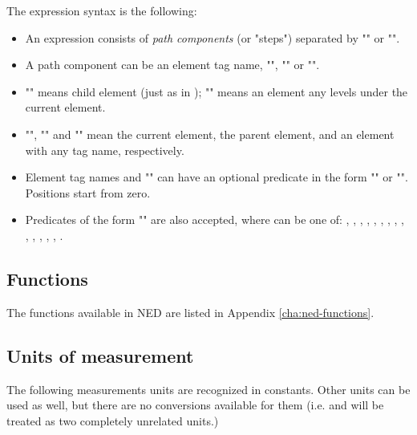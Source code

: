 The expression syntax is the following:
\begin{itemize}
  \item An expression consists of \textit{path components} (or "steps")
        separated by "\ttt{/}" or "\ttt{//}".
  \item A path component can be an element tag name, "\ttt{*}", ""
        or "".
  \item "\ttt{/}" means child element (just as in );
        "\ttt{//}" means an element any levels under the current element.
  \item "", "" and "\ttt{*}" mean the current element,
        the parent element, and an element with any tag name, respectively.
  \item Element tag names and "\ttt{*}" can have an optional predicate
        in the form "\ttt{[position]}" or "\ttt{[@attribute='value']}".
        Positions start from zero.
  \item Predicates of the form "\ttt{[@attribute=\textit{\$param}]}" are also
        accepted, where  can be one of:
        ,
        ,
        ,
        ,
        ,
        ,
        ,
        ,
        ,
        ,
        ,
        ,
        ,
        ,
        .
\end{itemize}

\subsection{Functions}

The functions available in NED are listed in Appendix
\ref{cha:ned-functions}.

\subsection{Units of measurement}
\label{ch-ned-ref:sec:units}

The following measurements units are recognized in constants. Other units can
be used as well, but there are no conversions available for them (i.e.
 and  will be treated as two completely unrelated
units.)

